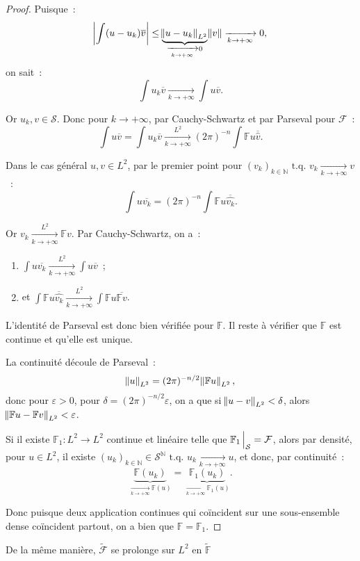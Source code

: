 \documentclass{report}
\newcommand{\N}{{\mathbb N}}
\newcommand{\tq}{\text{ t.q. }}
\newcommand{\pinfty}{{+\infty}}
\theoremstyle{definition}
\theoremstyle{remark}
\begin{document}
\begin{proof}
Puisque~:
\[\abs {\int (u-u_k)\overline v} \leq \underbrace {\norm {u-u_k}_{L^2}}_{\xrightarrow[k \to \pinfty]{} 0} \norm v \xrightarrow[k \to \pinfty]{} 0,\]
on sait~:
\[\int u_k\overline v \xrightarrow[k \to \pinfty]{} \int u\overline v.\]

Or $u_k, v \in \mathcal S$. Donc pour $k \to \pinfty$, par Cauchy-Schwartz et par Parseval pour $\mathcal F$~:
\[\int u\overline v = \int u_k\overline v \xrightarrow[k \to \pinfty]{L^2} (2\pi)^{-n}\int\mathbb Fu\overline {\hat v}.\]

Dans le cas général $u, v \in L^2$, par le premier point pour $(v_k)_{k \in \N} \tq v_k \xrightarrow[k \to \pinfty]{} v$~:
\[\int u\overline {v_k} = (2\pi)^{-n}\int \mathbb Fu\overline {\hat {v_k}}.\]

Or $v_k \xrightarrow[k \to \pinfty]{L^2} \mathbb Fv$. Par Cauchy-Schwartz, on a~:
\begin{enumerate}
	\item $\int u\overline {v_k} \xrightarrow[k \to \pinfty]{L^2} \int u\overline v$~;
	\item et $\int \mathbb Fu\overline {\hat {v_k}} \xrightarrow[k \to \pinfty]{L^2} \int \mathbb Fu\overline {\mathbb Fv}$.
\end{enumerate}

L'identité de Parseval est donc bien vérifiée pour $\mathbb F$. Il reste à vérifier que $\mathbb F$ est continue et qu'elle est unique.

La continuité découle de Parseval~:
\[\norm u_{L^2} = (2\pi)^{-n/2}\norm {\mathbb Fu}_{L^2},\]
donc pour $\varepsilon > 0$, pour $\delta = (2\pi)^{-n/2}\varepsilon$, on a que si $\norm {u-v}_{L^2} < \delta$, alors $\norm {\mathbb Fu - \mathbb Fv}_{L^2} < \varepsilon$.

Si il existe $\mathbb F_1 : L^2 \to L^2$ continue et linéaire telle que $\mathbb F_1\sVert[2]_{\mathcal S} = \mathcal F$, alors par densité, pour $u \in L^2$, il existe
$(u_k)_{k \in \N} \in \mathcal S^\N \tq u_k \xrightarrow[k \to \pinfty]{} u$, et donc, par continuité~:
\[\underbrace {\mathbb F(u_k)}_{\xrightarrow[k \to \pinfty]{} \mathbb F(u)} = \underbrace {\mathbb F_1(u_k)}_{\xrightarrow[k \to \pinfty]{} \mathbb F_1(u)}.\]

Donc puisque deux application continues qui coïncident sur une sous-ensemble dense coïncident partout, on a bien que $\mathbb F = \mathbb F_1$.
\end{proof}

De la même manière, $\tilde {\mathcal F}$ se prolonge sur $L^2$ en $\tilde {\mathbb F}$
\end{document}
